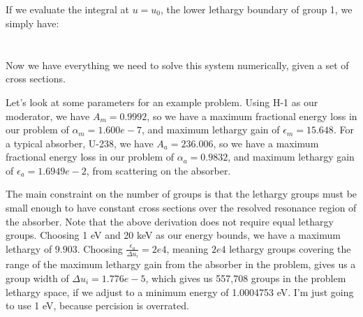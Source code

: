 \documentclass{article}
\begin{document}
        If we evaluate the integral at $u = u_0$, the lower lethargy boundary of group 1, we simply have:
        
        \begin{align}
        \begin{split}
            \label{eq:balance_group-1}
        \end{split}
        \end{align}

        Now we have everything we need to solve this system numerically, given a set of cross sections.


        Let's look at some parameters for an example problem.
        Using H-1 as our moderator, we have 
        $A_m = 0.9992$, so we have a
        maximum fractional energy loss in our problem of $\alpha_m = 1.600e-7$, and 
        maximum lethargy gain of $\epsilon_m = 15.648$. 
        For a typical absorber, U-238, we have 
        $A_a = 236.006$, so we have a
        maximum fractional energy loss in our problem of $\alpha_a = 0.9832$, and 
        maximum lethargy gain of $\epsilon_a = 1.6949e-2$, from scattering on the absorber. 
        
        
        The main constraint on the number of groups is that the lethargy groups must be small
        enough to have constant cross sections over the resolved resonance region of the absorber.
        Note that the above derivation does not require equal lethargy groups.
        Choosing 1 eV and 20 keV as our energy bounds, we have a maximum lethargy of $9.903$.
        Choosing $\frac{\epsilon_a}{\Delta u_i} = 2e4$, meaning $2e4$ lethargy groups 
        covering the range of the maximum lethargy gain from the absorber in the problem, 
        gives us a group width of $\Delta u_i = 1.776e-5$,
        which gives us 557,708 groups in the problem lethargy space, if we adjust to a 
        minimum energy of 1.0004753 eV. 
        I'm just going to use 1 eV, because percision is overrated.
    
\end{document}
